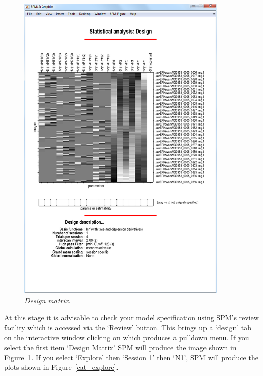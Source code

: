 \begin{figure}
\begin{center}
\includegraphics[width=100mm]{faces/cat_design}
\caption{\em Design matrix. \label{cat_design}}
\end{center}
\end{figure}

At this stage it is advisable to check your model specification using SPM's review facility which is accessed via the `Review' button. This brings up a `design' tab on the interactive window clicking on which produces a pulldown menu. If you select the first item `Design Matrix' SPM will produce the image shown in Figure~\ref{cat_design}. If you select `Explore' then `Session 1' then `N1', SPM will produce the plots shown in Figure~\ref{cat_explore}.

